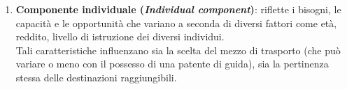 \begin{enumerate}
    \item \textbf{Componente individuale (\textit{Individual component})}: riflette i bisogni, le capacità e le opportunità che variano a seconda di diversi fattori come età, reddito, livello di istruzione dei diversi individui.\\
        Tali caratteristiche influenzano sia la scelta del mezzo di trasporto (che può variare o meno con il possesso di una patente di guida), sia la pertinenza stessa delle destinazioni raggiungibili.
    \end{enumerate}
 

